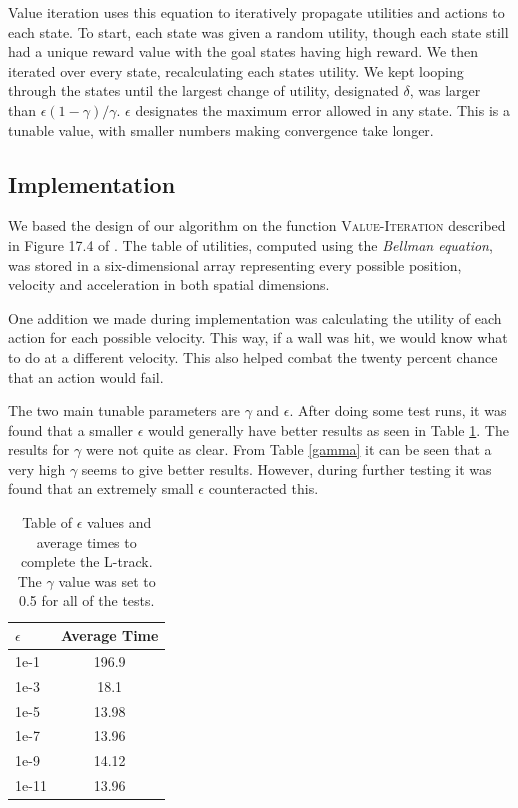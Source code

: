 \documentclass{article}
\begin{document}
	Value iteration uses this equation to iteratively propagate utilities and actions to each state. To start, each state was given a random utility, though each state still had a unique reward value with the goal states having high reward. We then iterated over every state, recalculating each states utility. We kept looping through the states until the largest change of utility, designated $\delta$, was larger than $\epsilon(1-\gamma)/\gamma$. $\epsilon$ designates the maximum error allowed in any state. This is a tunable value, with smaller numbers making convergence take longer.
	\subsection{Implementation}
	
	We based the design of our algorithm on the function \textsc{Value-Iteration} described in Figure 17.4 of \cite{ai}. 
	The table of utilities, computed using the \textit{Bellman equation}, was stored in a six-dimensional array representing every possible position, velocity and acceleration in both spatial dimensions.
	
	One addition we made during implementation was calculating the utility of each action for each possible velocity. This way, if a wall was hit, we would know what to do at a different velocity. This also helped combat the twenty percent chance that an action would fail.
	
	The two main tunable parameters are $\gamma$ and $\epsilon$. After doing some test runs, it was found that a smaller $\epsilon$ would generally have better results as seen in Table \ref{epsilon}. The results for $\gamma$ were not quite as clear. From Table \ref{gamma} it can be seen that a very high $\gamma$ seems to give better results. However, during further testing it was found that an extremely small $\epsilon$ counteracted this.
	\begin{table}
		\centering
		\begin{tabular}{|l|c|}
			\hline
			$\epsilon$ & Average Time \\ \hline
			1e-1 & 196.9 \\ 
			1e-3 & 18.1 \\
			1e-5 & 13.98\\
			1e-7 & 13.96 \\
			1e-9 & 14.12 \\ 
			1e-11 & 13.96 \\ \hline
		\end{tabular}
		\caption{Table of $\epsilon$ values and average times to complete the L-track. \\ The $\gamma$ value was set to 0.5 for all of the tests.}
		\label{epsilon}
	\end{table}
	
\end{document}
